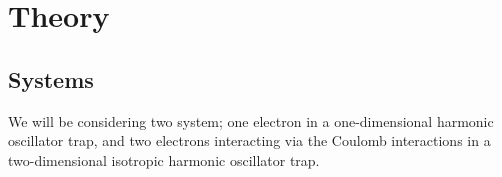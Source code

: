 \section{Theory}\label{sec:Theory}


\subsection{Systems}\label{sec:systems}

We will be considering two system; one electron in a one-dimensional harmonic oscillator trap, and two electrons interacting via the Coulomb interactions in a two-dimensional isotropic harmonic oscillator trap.

